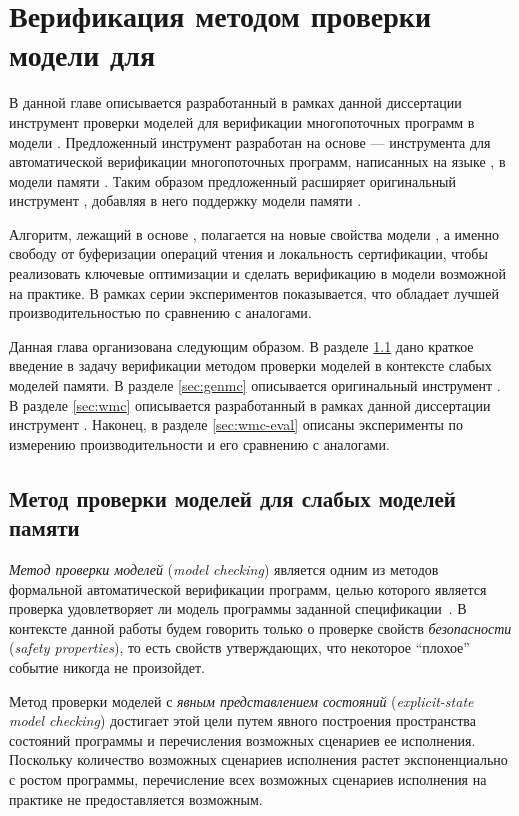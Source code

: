 \chapter{Верификация методом проверки модели для \WkmS}
\label{ch:mc-weakestmo2}

В данной главе описывается разработанный в рамках данной диссертации 
инструмент проверки моделей \wmc для верификации 
многопоточных программ в модели \WkmS.
Предложенный инструмент разработан на основе \genmc --- 
инструмента для автоматической верификации многопоточных программ, 
написанных на языке \CLANG, в модели памяти \RCMM. 
Таким образом предложенный \wmc расширяет 
оригинальный инструмент \genmc, 
добавляя в него поддержку модели памяти \WkmS.  

Алгоритм, лежащий в основе \wmc, полагается на новые свойства модели \WkmS, 
а именно свободу от буферизации операций чтения и 
локальность сертификации, чтобы реализовать ключевые 
оптимизации и сделать верификацию в модели \WkmS возможной на практике.  
В рамках серии экспериментов показывается, что 
\wmc обладает лучшей производительностью по сравнению с аналогами.

Данная глава организована следующим образом. 
В разделе \ref{sec:mc-wmm} дано краткое введение 
в задачу верификации методом проверки моделей 
в контексте слабых моделей памяти.
В разделе \ref{sec:genmc} описывается оригинальный инструмент 
\genmc.
В разделе \ref{sec:wmc} описывается разработанный в 
рамках данной диссертации инструмент \wmc.
Наконец, в разделе \ref{sec:wmc-eval} описаны эксперименты 
по измерению производительности \wmc и его сравнению с аналогами.

\section{Метод проверки моделей для слабых моделей памяти}
\label{sec:mc-wmm}

\emph{Метод проверки моделей} (\emph{model checking}) 
является одним из методов формальной автоматической верификации программ,
целью которого является проверка удовлетворяет ли 
модель программы заданной спецификации~\cite{Baier:2008}. 
В контексте данной работы будем говорить только 
о проверке свойств \emph{безопасности} (\emph{safety properties}), 
то есть свойств утверждающих, что некоторое 
``плохое'' событие никогда не произойдет. 

Метод проверки моделей с \emph{явным представлением состояний} 
(\emph{explicit-state model checking}) достигает 
этой цели путем явного построения пространства состояний программы 
и перечисления возможных сценариев ее исполнения.
Поскольку количество возможных сценариев исполнения 
растет экспоненциально с ростом программы, 
перечисление всех возможных сценариев исполнения 
на практике не предоставляется возможным. 

